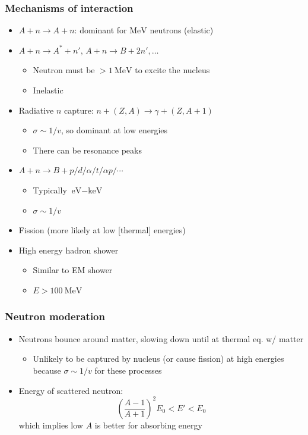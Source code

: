 \documentclass[11pt]{article}
\newcommand{\ev}{\text{eV}}
\newcommand{\kev}{\text{keV}}
\newcommand{\mev}{\text{MeV}}
\begin{document}
\subsubsection{Mechanisms of interaction}
\begin{itemize}
  \item $A+n\rightarrow A+n$: dominant for $\mev$ neutrons (elastic)
  \item $A+n\rightarrow A^*+n'$, $A+n\rightarrow B+2n',\dots$
  \begin{itemize}
    \item Neutron must be $> 1~\mev$ to excite the nucleus
    \item Inelastic
  \end{itemize}
  \item Radiative $n$ capture: $n+(Z,A)\rightarrow \gamma+(Z,A+1)$
  \begin{itemize}
    \item $\sigma \sim 1/v$, so dominant at low energies
    \item There can be resonance peaks
  \end{itemize}
  \item $A+n\rightarrow B + p/d/\alpha/t/\alpha p/\cdots$
  \begin{itemize}
    \item Typically $\ev-\kev$
    \item $\sigma\sim 1/v$
  \end{itemize}
  \item Fission (more likely at low [thermal] energies)
  \item High energy hadron shower
  \begin{itemize}
    \item Similar to EM shower
    \item $E > 100~\mev$
  \end{itemize}
\end{itemize}
\subsubsection{Neutron moderation}
\begin{itemize}
  \item Neutrons bounce around matter, slowing down until at thermal eq. w/ matter
  \begin{itemize}
    \item Unlikely to be captured by nucleus (or cause fission) at high energies because $\sigma\sim 1/v$ for these processes
  \end{itemize}
  \item Energy of scattered neutron:
  \begin{equation}
    \left(\frac{A-1}{A+1}\right)^2 E_0 < E' <E_0
  \end{equation}
  which implies low $A$ is better for absorbing energy
\end{itemize}
\end{document}
